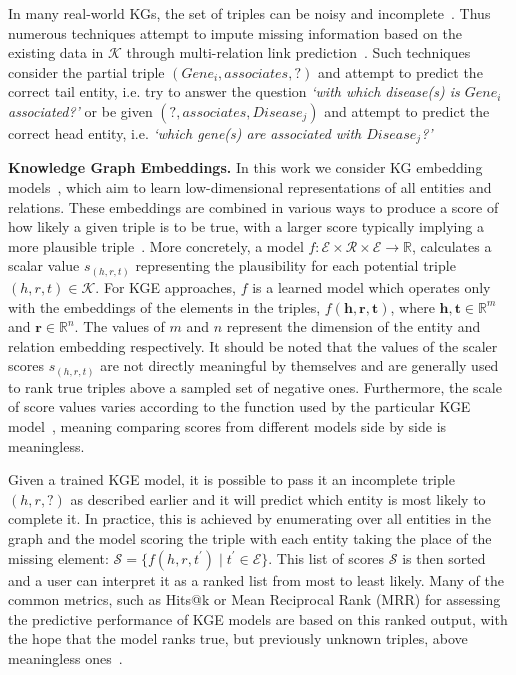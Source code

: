 In many real-world KGs, the set of triples can be noisy and incomplete~\cite{ali2020bringing}. Thus numerous techniques attempt to impute missing information based on the existing data in \(\mathcal{K}\) through multi-relation link prediction~\cite{ruffinelli2019you}. Such techniques consider the partial triple \(( \mathit{Gene}_i, \mathit{associates}, ?) \) and attempt to predict the correct tail entity, i.e. try to answer the question \emph{`with which disease(s) is \(\mathit{Gene_i}\) associated?'} or be given \(( ?, \mathit{associates}, \mathit{Disease}_j) \) and attempt to predict the correct head entity, i.e. \emph{`which gene(s) are associated with \(\mathit{Disease_j}\)?'}

\textbf{Knowledge Graph Embeddings.} In this work we consider KG embedding models~\cite{ji2020survey, wang2017knowledge}, which aim to learn low-dimensional representations of all entities and relations. These embeddings are combined in various ways to produce a score of how likely a given triple is to be true, with a larger score typically implying a more plausible triple~\cite{ali2020bringing}. More concretely, a model \(f : \mathcal{E} \times \mathcal{R} \times \mathcal{E} \rightarrow \mathbb{R} \), calculates a scalar value \(s_{(h,r,t)}\) representing the plausibility for each potential triple \((h,r,t) \in \mathcal{K}\). For KGE approaches, \(f\) is a learned model which operates only with the embeddings of the elements in the triples, \(f( \mathbf{h}, \mathbf{r} , \mathbf{t} )\), where \(\mathbf{h}, \mathbf{t} \in \mathbb{R}^m \) and \(\mathbf{r} \in \mathbb{R}^n \). The values of \(m\) and \(n\) represent the dimension of the entity and relation embedding respectively. It should be noted that the values of the scaler scores \(s_{(h,r,t)}\) are not directly meaningful by themselves and are generally used to rank true triples above a sampled set of negative ones. Furthermore, the scale of score values varies according to the function used by the particular KGE model~\cite{ali2020bringing}, meaning comparing scores from different models side by side is meaningless.

Given a trained KGE model, it is possible to pass it an incomplete triple \((h,r,?)\) as described earlier and it will predict which entity is most likely to complete it. In practice, this is achieved by enumerating over all entities in the graph and the model scoring the triple with each entity taking the place of the missing element: \( \mathcal{S} = \{f(h,r,t^\prime) \mid t^\prime \in \mathcal{E} \} \). This list of scores \(\mathcal{S}\) is then sorted and a user can interpret it as a ranked list from most to least likely. Many of the common metrics, such as Hits@k or Mean Reciprocal Rank (MRR) for assessing the predictive performance of KGE models are based on this ranked output, with the hope that the model ranks true, but previously unknown triples, above meaningless ones~\cite{ali2020bringing}.


